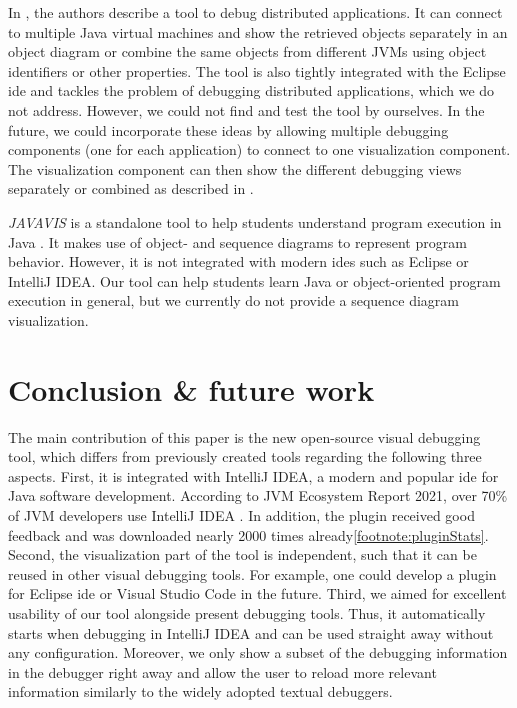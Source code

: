 \documentclass[conference]{IEEEtran}
\newcommand{\intellij}{IntelliJ IDEA}
\begin{document}
In \cite{kochGraphicalDebuggingDistributed2015}, the authors describe a tool to debug distributed applications.
It can connect to multiple Java virtual machines and show the retrieved objects separately in an object diagram or combine the same objects from different JVMs using object identifiers or other properties.
The tool is also tightly integrated with the Eclipse \gls*{ide} and tackles the problem of debugging distributed applications, which we do not address.
However, we could not find and test the tool by ourselves.
In the future, we could incorporate these ideas by allowing multiple debugging components (one for each application) to connect to one visualization component.
The visualization component can then show the different debugging views separately or combined as described in \cite{kochGraphicalDebuggingDistributed2015}.

\textit{JAVAVIS} is a standalone tool to help students understand program execution in Java \cite{oechsleJAVAVISAutomaticProgram2002}.
It makes use of object- and sequence diagrams to represent program behavior.
However, it is not integrated with modern \glspl*{ide} such as Eclipse or \intellij{}.
Our tool can help students learn Java or object-oriented program execution in general, but we currently do not provide a sequence diagram visualization.

\section{Conclusion \& future work} \label{sec:conclusion}
The main contribution of this paper is the new open-source visual debugging tool, which differs from previously created tools regarding the following three aspects.
First, it is integrated with \intellij{}, a modern and popular \gls*{ide} for Java software development.
According to JVM Ecosystem Report 2021, over 70\% of JVM developers use \intellij{}  \cite{JVMEcosystemReport2021}.
In addition, the plugin received good feedback and was downloaded nearly 2000 times already\cref{footnote:pluginStats}.
Second, the visualization part of the tool is independent, such that it can be reused in other visual debugging tools.
For example, one could develop a plugin for Eclipse \gls*{ide} or Visual Studio Code in the future.
Third, we aimed for excellent usability of our tool alongside present debugging tools.
Thus, it automatically starts when debugging in \intellij{} and can be used straight away without any configuration.
Moreover, we only show a subset of the debugging information in the debugger right away and allow the user to reload more relevant information similarly to the widely adopted textual debuggers.
\end{document}
